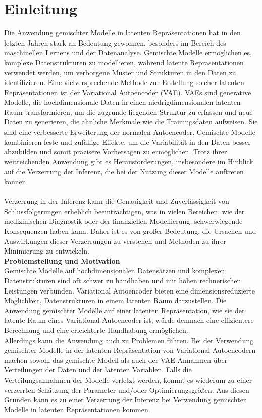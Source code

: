 \documentclass[%
thesis=student,%
coverpage=false,%
titlepage=false,%
headmarks=true, %
german,%
font=libertine, %
math=newpxtx, %
BCOR=5mm,%
coverBCOR=11mm%
]{tumbook}
\theoremstyle{break}
\begin{document}
\chapter{Einleitung}
Die Anwendung gemischter Modelle in latenten Repräsentationen hat in den letzten Jahren stark an Bedeutung gewonnen, besonders im Bereich des maschinellen Lernens und der Datenanalyse. Gemischte Modelle ermöglichen es, komplexe Datenstrukturen zu modellieren, während latente Repräsentationen verwendet werden, um verborgene Muster und Strukturen in den Daten zu identifizieren. Eine vielversprechende Methode zur Erstellung solcher latenten Repräsentationen ist der Variational Autoencoder (VAE). VAEs sind generative Modelle, die hochdimensionale Daten in einen niedrigdimensionalen latenten Raum transformieren, um die zugrunde liegenden Struktur zu erfassen und neue Daten zu generieren, die ähnliche Merkmale wie die Trainingsdaten aufweisen. Sie sind eine verbesserte Erweiterung der normalen Autoencoder. Gemischte Modelle kombinieren feste und zufällige Effekte, um die Variabilität in den Daten besser abzubilden und somit präzisere Vorhersagen zu ermöglichen. Trotz ihrer weitreichenden Anwendung gibt es Herausforderungen, insbesondere im Hinblick auf die Verzerrung der Inferenz, die bei der Nutzung dieser Modelle auftreten können. \\
\\
Verzerrung in der Inferenz kann die Genauigkeit und Zuverlässigkeit von Schlussfolgerungen erheblich beeinträchtigen, was in vielen Bereichen, wie der medizinischen Diagnostik oder der finanziellen Modellierung, schwerwiegende Konsequenzen haben kann. Daher ist es von großer Bedeutung, die Ursachen und Auswirkungen dieser Verzerrungen zu verstehen und Methoden zu ihrer Minimierung zu entwickeln.
\\
\textbf{Problemstellung und Motivation}\\
Gemischte Modelle auf hochdimensionalen Datensätzen und komplexen Datenstrukturen sind oft schwer zu handhaben und mit hohen rechnerischen Leistungen verbunden. Variational Autoencoder bieten eine dimensionsreduzierte Möglichkeit, Datenstrukturen in einem latenten Raum darzustellen. Die Anwendung gemischter Modelle auf einer latenten Repräsentation, wie sie der latente Raum eines Variational Autoencoder ist, würde demnach eine effizientere Berechnung und eine erleichterte Handhabung ermöglichen.\\
Allerdings kann die Anwendung auch zu Problemen führen. Bei der Verwendung gemischter Modelle in der latenten Repräsentation von Variational Autoencodern machen sowohl das gemischte Modell als auch der VAE Annahmen über Verteilungen der Daten und der latenten Variablen. Falls die Verteilungsannahmen der Modelle verletzt werden, kommt es wiederum zu einer verzerrten Schätzung der Parameter und/oder Optimierungsgrößen. Aus diesen Gründen kann es zu einer Verzerrung der Inferenz bei Verwendung gemischter Modelle in latenten Repräsentationen kommen.\\
\end{document}
